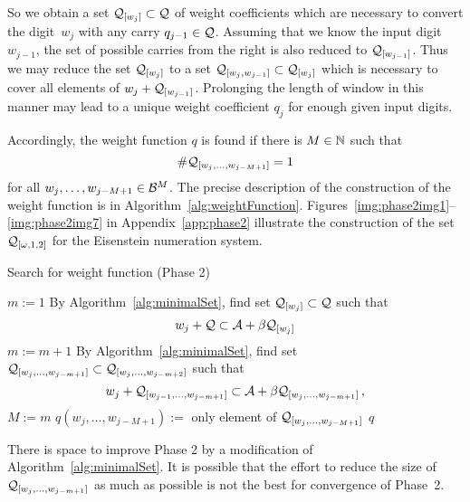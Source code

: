 \begin{upravit}
    So we obtain a set $\mathcal{Q}_{[w_j]}\subset\mathcal{Q}$ of weight coefficients which are necessary to convert the digit~$w_j$ with any carry $q_{j-1}\in\mathcal{Q}$. Assuming that we know the input digit $w_{j-1}$, the set of possible carries from the right is also reduced to $\mathcal{Q}_{[w_{j-1}]}$. Thus we may reduce the set $\mathcal{Q}_{[w_j]}$ to a set $\mathcal{Q}_{[w_j,w_{j-1}]}\subset \mathcal{Q}_{[w_j]}$ which is necessary to cover all elements of $w_j + \mathcal{Q}_{[w_{j-1}]}$. Prolonging the length of window in this manner may lead to a unique weight coefficient $q_j$ for enough given input digits.  
    
    Accordingly, the weight function $q$ is found if there is $M\in\mathbb{N}$ such that 
    $$
    \#\mathcal{Q}_{[w_{j},\dots, w_{j-M+1}]}=1
    $$
    for all $w_{j},\dots, w_{j-M+1} \in \mathcal{B}^M$. The precise description of the construction of the weight function is in  Algorithm~\ref{alg:weightFunction}.  
 Figures~\ref{img:phase2img1}--\ref{img:phase2img7} in Appendix~\ref{app:phase2} illustrate the construction of the set $\mathcal{Q}_{[\omega,1,2]}$ for the Eisenstein numeration system.   
    
\begin{algorithm}
  \caption{Search for weight function (Phase 2)}
    \label{alg:weightFunction}
  \begin{algorithmic}[1]
    \STATE $m:=1$
        \STATE By Algorithm~\ref{alg:minimalSet}, find set $\mathcal{Q}_{[w_j]} \subset \mathcal{Q}$ such that
          $$
          w_j + \mathcal{Q} \subset \mathcal{A} + \beta \mathcal{Q}_{[w_j]}
          $$
    \ENDFOR
        \STATE $m:= m +1$
            \STATE By Algorithm~\ref{alg:minimalSet}, find set $\mathcal{Q}_{[w_j,\dots, w_{j-m+1}]} \subset \mathcal{Q}_{[w_j,\dots, w_{j-m+2}]}$ such that
              $$
              w_j + \mathcal{Q}_{[w_{j-1},\dots, w_{j-m+1}]} \subset \mathcal{A} + \beta \mathcal{Q}_{[w_j,\dots, w_{j-m+1}]}\,,
              $$
        \ENDFOR  
    \ENDWHILE  
    \STATE $M:= m$ 
        \STATE $q(w_j,\dots, w_{j-M+1}):=$ only element of $\mathcal{Q}_{[w_j,\dots, w_{j-M+1}]}$
    \ENDFOR
    \RETURN $q$
  \end{algorithmic}
\end{algorithm}
    


There is space to improve Phase 2 by a modification of Algorithm~\ref{alg:minimalSet}. It is possible that the effort to reduce the size of  $\mathcal{Q}_{[w_j,\dots, w_{j-m+1}]}$ as much as possible is not the best for convergence of Phase~2.


\end{upravit}
